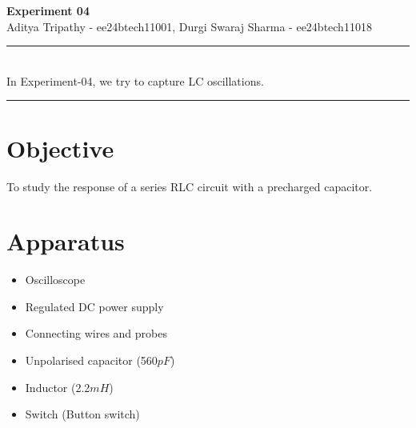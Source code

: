 \documentclass[a4paper,12pt]{article}
\renewenvironment{abstract}
 {\par\noindent\textbf{\abstractname}\ \ignorespaces \\}
 {\par\noindent\medskip}
\begin{document}
\pagestyle{fancy}
\thispagestyle{empty}
\fancyhead[L]{}
\renewcommand*{\thefootnote}{\fnsymbol{footnote}}
\begin{center}
\Large{\textbf{Experiment 04}}
\vspace{0.4cm}
\normalsize
\\ Aditya Tripathy - ee24btech11001, Durgi Swaraj Sharma - ee24btech11018\\
\medskip
\normalsize
\end{center}
{\color{gray}\hrule}
\vspace{0.4cm}
\begin{abstract}
In Experiment-04, we try to capture LC oscillations.
\end{abstract}
{\color{gray}\hrule}
\medskip
\section{Objective}
To study the response of a series RLC circuit with a precharged capacitor.

\section{Apparatus}
\begin{itemize}
\item Oscilloscope
\item Regulated DC power supply
\item Connecting wires and probes
\item Unpolarised capacitor (560$pF$)
\item Inductor (2.2$mH$)
\item Switch (Button switch)
\end{itemize}
\end{document}
